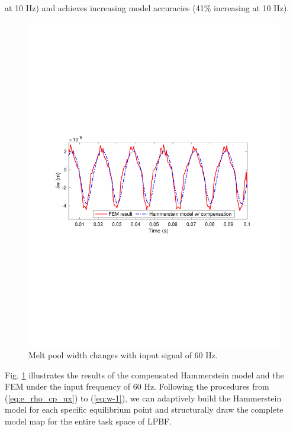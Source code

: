 \documentclass [11pt, proquest] {uwthesis}[2020/02/24]
\begin{document}
at 10 Hz) and achieves increasing model accuracies (41\% increasing
at 10 Hz). 
\begin{figure}
\begin{centering}
\includegraphics[clip,width=13cm]{Hammerstein/60Hz_demo}
\par\end{centering}
\centering{}\caption{\label{fig:60Hz}Melt pool width changes with input signal of 60 Hz.}
\end{figure}
Fig. \ref{fig:60Hz} illustrates the results of the compensated Hammerstein
model and the FEM under the input frequency of 60 Hz. Following the
procedures from (\ref{eq:e_rho_cp_ux}) to (\ref{eq:w-1}), we can
adaptively build the Hammerstein model for each specific equilibrium
point and structurally draw the complete model map for the entire
task space of LPBF.
\end{document}

